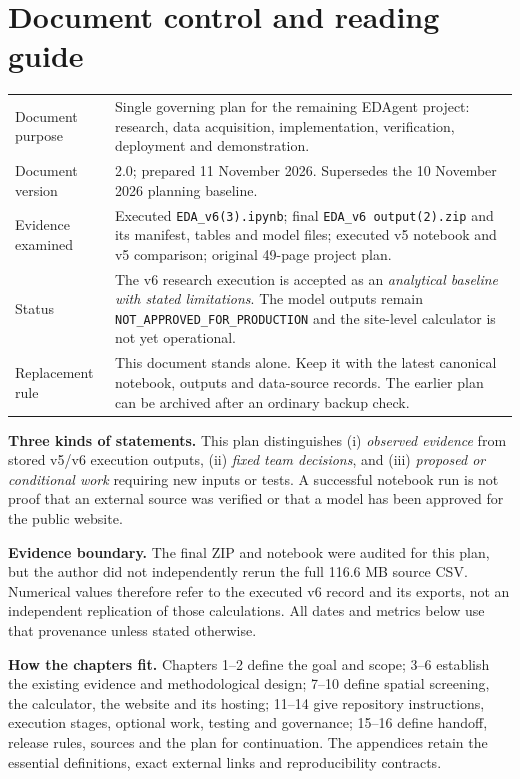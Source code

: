 \documentclass[11pt,a4paper,openany]{report}
\newcommand{\pathcode}[1]{\nolinkurl{#1}}
\begin{document}
\chapter*{Document control and reading guide}
\begin{tabularx}{\linewidth}{@{}L{37mm}Y@{}}
\toprule
Document purpose & Single governing plan for the remaining EDAgent project: research, data acquisition, implementation, verification, deployment and demonstration.\\
Document version & 2.0; prepared 11 November 2026. Supersedes the 10 November 2026 planning baseline.\\
Evidence examined & Executed \pathcode{EDA_v6(3).ipynb}; final \pathcode{EDA_v6 output(2).zip} and its manifest, tables and model files; executed v5 notebook and v5 comparison; original 49-page project plan.\\
Status & The v6 research execution is accepted as an \emph{analytical baseline with stated limitations}. The model outputs remain \pathcode{NOT_APPROVED_FOR_PRODUCTION} and the site-level calculator is not yet operational.\\
Replacement rule & This document stands alone. Keep it with the latest canonical notebook, outputs and data-source records. The earlier plan can be archived after an ordinary backup check.\\
\bottomrule
\end{tabularx}

\textbf{Three kinds of statements.} This plan distinguishes (i) \emph{observed evidence} from stored v5/v6 execution outputs, (ii) \emph{fixed team decisions}, and (iii) \emph{proposed or conditional work} requiring new inputs or tests. A successful notebook run is not proof that an external source was verified or that a model has been approved for the public website.

\textbf{Evidence boundary.} The final ZIP and notebook were audited for this plan, but the author did not independently rerun the full 116.6 MB source CSV. Numerical values therefore refer to the executed v6 record and its exports, not an independent replication of those calculations. All dates and metrics below use that provenance unless stated otherwise.

\textbf{How the chapters fit.} Chapters 1--2 define the goal and scope; 3--6 establish the existing evidence and methodological design; 7--10 define spatial screening, the calculator, the website and its hosting; 11--14 give repository instructions, execution stages, optional work, testing and governance; 15--16 define handoff, release rules, sources and the plan for continuation. The appendices retain the essential definitions, exact external links and reproducibility contracts.
\end{document}
